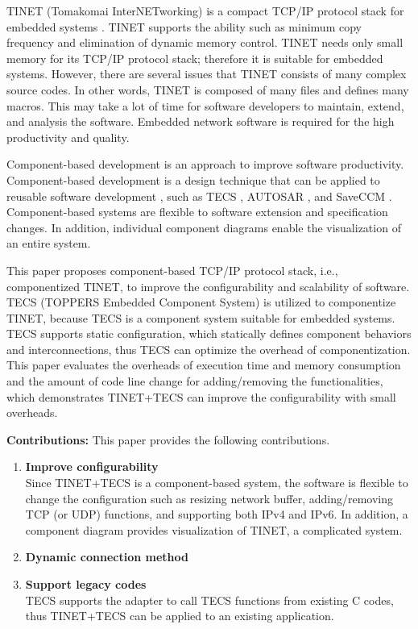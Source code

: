 \documentclass[conference]{IEEEtran/IEEEtran}
\begin{document}
TINET (Tomakomai InterNETworking) is a compact TCP/IP protocol stack for embedded systems \cite{url:TINET}.
TINET supports the ability such as minimum copy frequency and elimination of dynamic memory control.
TINET needs only small memory for its TCP/IP protocol stack; therefore it is suitable for embedded systems.
However, there are several issues that TINET consists of many complex source codes.
In other words, TINET is composed of many files and defines many macros.
This may take a lot of time for software developers to maintain, extend, and analysis the software.
Embedded network software is required for the high productivity and quality.

Component-based development is an approach to improve software productivity.
Component-based development is a design technique that can be applied to reusable software development \cite{par:Crnkovic}\cite{par:CBD}, such as TECS \cite{par:TECS}, AUTOSAR \cite{url:AUTOSAR}, and SaveCCM \cite{par:SAVEapproach}.
Component-based systems are flexible to software extension and specification changes.
In addition, individual component diagrams enable the visualization of an entire system.

This paper proposes component-based TCP/IP protocol stack, i.e., componentized TINET, to improve the configurability and scalability of software.
TECS (TOPPERS Embedded Component System) \cite{par:TECS} is utilized to componentize TINET, because TECS is a component system suitable for embedded systems.
TECS supports static configuration, which statically defines component behaviors and interconnections, thus TECS can optimize the overhead of componentization.
This paper evaluates the overheads of execution time and memory consumption and the amount of code line change for adding/removing the functionalities, which demonstrates TINET+TECS can improve the configurability with small overheads.

{\bf Contributions:} This paper provides the following contributions.

\begin{enumerate}

    \item {\bf Improve configurability}\mbox{}\\
        Since TINET+TECS is a component-based system, the software is flexible to change the configuration such as resizing network buffer, adding/removing TCP (or UDP) functions, and supporting both IPv4 and IPv6.
        In addition, a component diagram provides visualization of TINET, a complicated system.

    \item {\bf Dynamic connection method}\mbox{}\\
        

    \item {\bf Support legacy codes}\mbox{}\\
        TECS supports the adapter to call TECS functions from existing C codes, thus TINET+TECS can be applied to an existing application.

\end{enumerate}
\end{document}

